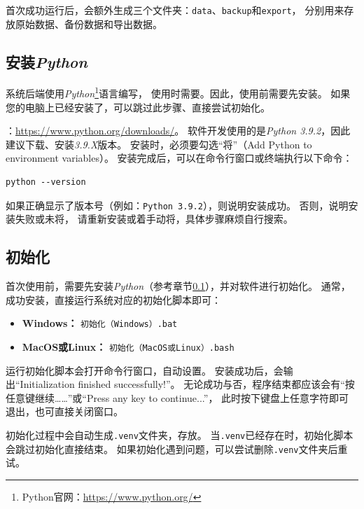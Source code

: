 \documentclass[12pt,titlepage]{article}
\newcommand{\Python}{\textit{Python}}
\begin{document}
首次成功运行后，会额外生成三个文件夹：\texttt{data}、\texttt{backup}和\texttt{export}，
分别用来存放原始数据、备份数据和导出数据。

\subsection{安装\Python}
\label{sec:install-python}

系统后端使用\Python\footnote{Python官网：\url{https://www.python.org/}}语言编写，
使用时需要。因此，使用前需要先安装。
如果您的电脑上已经安装了，可以跳过此步骤、直接尝试初始化。

：\url{https://www.python.org/downloads/}。
软件开发使用的是\textit{Python 3.9.2}，因此建议下载、安装\textit{3.9.X}版本。
安装时，必须要勾选“将”（Add Python to environment variables）。
安装完成后，可以在命令行窗口或终端执行以下命令：

\begin{verbatim}
python --version
\end{verbatim}

如果正确显示了版本号（例如：\texttt{Python 3.9.2}），则说明安装成功。
否则，说明安装失败或未将，
请重新安装或着手动将，具体步骤麻烦自行搜索。

\subsection{初始化}

首次使用前，需要先安装\Python（参考章节\ref{sec:install-python}），并对软件进行初始化。
通常，成功安装，直接运行系统对应的初始化脚本即可：

\begin{itemize}
    \item \textbf{Windows：} \texttt{初始化（Windows）.bat}
    \item \textbf{MacOS或Linux：} \texttt{初始化（MacOS或Linux）.bash}
\end{itemize}

运行初始化脚本会打开命令行窗口，自动设置。
安装成功后，会输出“Initialization finished successfully!”。
无论成功与否，程序结束都应该会有“按任意键继续……”或“Press any key to continue...”，
此时按下键盘上任意字符即可退出，也可直接关闭窗口。

初始化过程中会自动生成\texttt{.venv}文件夹，存放。
当\texttt{.venv}已经存在时，初始化脚本会跳过初始化直接结束。
如果初始化遇到问题，可以尝试删除\texttt{.venv}文件夹后重试。
\end{document}
